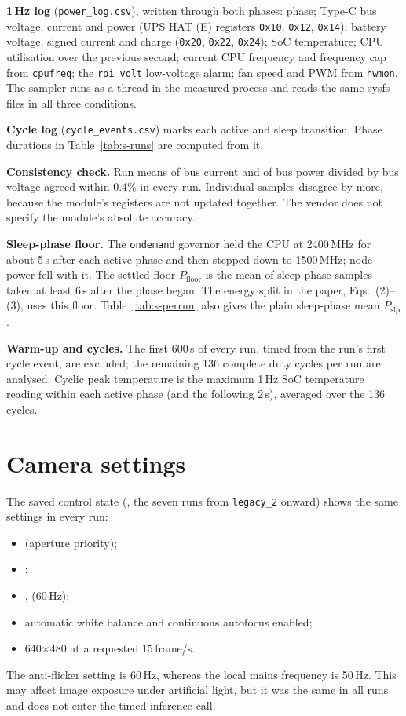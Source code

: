 \documentclass[10pt]{article}
\begin{document}
\textbf{1\,Hz log} (\texttt{power\_log.csv}), written through both phases: phase; Type-C bus voltage, current and power (UPS HAT (E) registers \texttt{0x10}, \texttt{0x12}, \texttt{0x14}); battery voltage, signed current and charge (\texttt{0x20}, \texttt{0x22}, \texttt{0x24}); SoC temperature; CPU utilisation over the previous second; current CPU frequency and frequency cap from \texttt{cpufreq}; the \texttt{rpi\_volt} low-voltage alarm; fan speed and PWM from \texttt{hwmon}. The sampler runs as a thread in the measured process and reads the same sysfs files in all three conditions.

\textbf{Cycle log} (\texttt{cycle\_events.csv}) marks each active and sleep transition. Phase durations in Table~\ref{tab:s-runs} are computed from it.

\textbf{Consistency check.} Run means of bus current and of bus power divided by bus voltage agreed within 0.4\% in every run. Individual samples disagree by more, because the module's registers are not updated together. The vendor does not specify the module's absolute accuracy.

\textbf{Sleep-phase floor.} The \texttt{ondemand} governor held the CPU at 2400\,MHz for about 5\,s after each active phase and then stepped down to 1500\,MHz; node power fell with it. The settled floor $P_\mathrm{floor}$ is the mean of sleep-phase samples taken at least 6\,s after the phase began. The energy split in the paper, Eqs.~(2)--(3), uses this floor. Table~\ref{tab:s-perrun} also gives the plain sleep-phase mean $P_\mathrm{slp}$.

\textbf{Warm-up and cycles.} The first 600\,s of every run, timed from the run's first cycle event, are excluded; the remaining 136 complete duty cycles per run are analysed. Cyclic peak temperature is the maximum 1\,Hz SoC temperature reading within each active phase (and the following 2\,s), averaged over the 136 cycles.

\section{Camera settings}
The saved control state (, the seven runs from \texttt{legacy\_2} onward) shows the same settings in every run:
\begin{itemize}\setlength{\itemsep}{0pt}
\item {} (aperture priority);
\item {};
\item {},  (60\,Hz);
\item automatic white balance and continuous autofocus enabled;
\item 640$\times$480 at a requested 15\,frame/s.
\end{itemize}
The anti-flicker setting is 60\,Hz, whereas the local mains frequency is 50\,Hz. This may affect image exposure under artificial light, but it was the same in all runs and does not enter the timed inference call.
\end{document}
